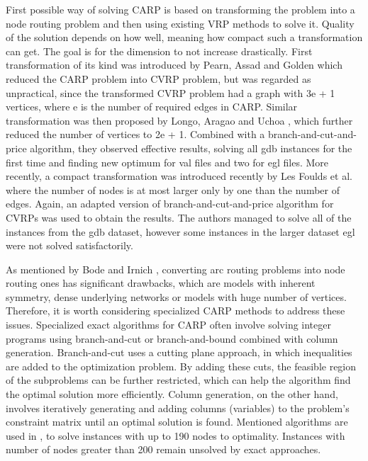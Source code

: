 \documentclass[oneside]{ctuthesis}
\theoremstyle{plain}
\theoremstyle{definition}
\theoremstyle{note}
\begin{document}
First possible way of solving CARP is based on transforming the problem into a node routing problem and then using existing VRP methods to solve it. Quality of the solution depends on how well, meaning how compact such a transformation can get. The goal is for the dimension to not increase drastically.
First transformation of its kind was introduced by Pearn, Assad and Golden \cite{PEARN1987285} which reduced the CARP problem into CVRP problem, but was regarded as unpractical, since the transformed CVRP problem had a graph with 3e + 1 vertices, where e is the number of required edges in CARP. Similar transformation was then proposed by Longo, Aragao and Uchoa \cite{LONGO20061823}, which further reduced the number of vertices to 2e + 1. Combined with a branch-and-cut-and-price algorithm, they observed effective results, solving all gdb instances for the first time and finding new optimum for val files and two for egl files.
More recently, a compact transformation was introduced recently by Les Foulds et al. \cite{foulds2015compact} where the number of nodes is at most larger only by one than the number of edges. Again, an adapted version of branch-and-cut-and-price algorithm for CVRPs was used to obtain the results. The authors managed to solve all of the instances from the gdb dataset, however some instances in the larger dataset egl were not solved satisfactorily.

As mentioned by Bode and Irnich \cite{bode2012cut}, converting arc routing problems into node routing ones has significant drawbacks, which are models with inherent symmetry, dense underlying networks or models with huge number of vertices. Therefore, it is worth considering specialized CARP methods to address these issues. 
Specialized exact algorithms for CARP often involve solving integer programs using branch-and-cut or branch-and-bound combined with column generation. Branch-and-cut uses a cutting plane approach, in which inequalities are added to the optimization problem.  By adding these cuts, the feasible region of the subproblems can be further restricted, which can help the algorithm find the optimal solution more efficiently. Column generation, on the other hand, involves iteratively generating and adding columns (variables) to the problem's constraint matrix until an optimal solution is found. Mentioned algorithms are used in \cite{bode2012cut}, \cite{bartolini2013improved} to solve instances with up to 190 nodes to optimality. Instances with number of nodes greater than 200 remain unsolved by exact approaches. 
\end{document}
